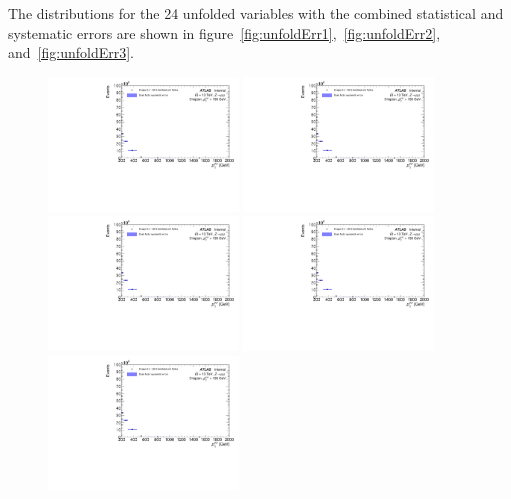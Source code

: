 The distributions for the 24 unfolded variables with the combined statistical and systematic errors are shown in figure~\ref{fig:unfoldErr1},~\ref{fig:unfoldErr2}, and~\ref{fig:unfoldErr3}.

\begin{figure}[h!]
  \centering
  \includegraphics[page=32,width=0.45\textwidth]{figures/unfoldErrPlots.pdf}
  \includegraphics[page=64,width=0.45\textwidth]{figures/unfoldErrPlots.pdf} \\
  \includegraphics[page=128,width=0.45\textwidth]{figures/unfoldErrPlots.pdf}
  \includegraphics[page=160,width=0.45\textwidth]{figures/unfoldErrPlots.pdf} \\
  \includegraphics[page=188,width=0.45\textwidth]{figures/unfoldErrPlots.pdf}

\end{figure}
